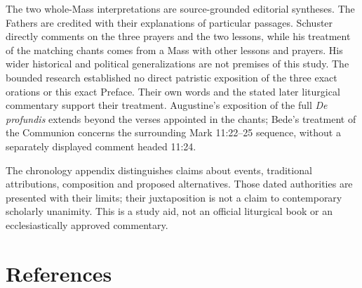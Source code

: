 The two whole-Mass interpretations are source-grounded editorial syntheses. The Fathers are credited with their explanations of particular passages. Schuster directly comments on the three prayers and the two lessons, while his treatment of the matching chants comes from a Mass with other lessons and prayers. His wider historical and political generalizations are not premises of this study. The bounded research established no direct patristic exposition of the three exact orations or this exact Preface. Their own words and the stated later liturgical commentary support their treatment. Augustine's exposition of the full \textit{De profundis} extends beyond the verses appointed in the chants; Bede's treatment of the Communion concerns the surrounding Mark 11:22--25 sequence, without a separately displayed comment headed 11:24.

The chronology appendix distinguishes claims about events, traditional attributions, composition and proposed alternatives. Those dated authorities are presented with their limits; their juxtaposition is not a claim to contemporary scholarly unanimity. This is a study aid, not an official liturgical book or an ecclesiastically approved commentary.

\section{References}

